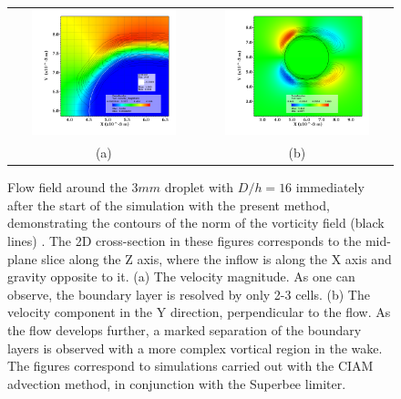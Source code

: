 \begin{figure}
\begin{center}
\begin{tabular}{cc}
\hspace*{-1.0cm}
\includegraphics[width=0.8\textwidth]{plots/raindrop/mc_vorticity_zoom.png} & 
\hspace{-0.4cm}%
\includegraphics[width=0.8\textwidth]{plots/raindrop/mc_vorticity.png} \\ 
\hspace{-0.8cm}%
(a) & (b)
\end{tabular}
\end{center}
\caption{Flow field around the $3 mm$ droplet with $D/h = 16$ immediately 
after the start of the simulation with the present method, 
demonstrating the contours of the norm of the vorticity field (black lines) . 
The 2D cross-section in these figures corresponds to the 
mid-plane slice along the Z axis, where the inflow is along 
the X axis and gravity opposite to it. (a) The velocity magnitude. 
As one can observe, the boundary layer is resolved by only 2-3 cells. 
(b) The velocity component in the Y direction, perpendicular to the flow. 
As the flow develops further, a marked separation of the boundary layers is observed with 
a more complex vortical region in the wake.
The figures correspond to simulations carried out with the 
CIAM advection method, in conjunction with the Superbee limiter.}
\label{flow_field}
\end{figure}


